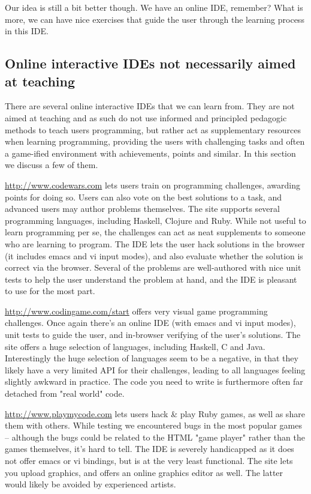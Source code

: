 Our idea is still a bit better though. We have an online IDE, remember? What 
is more, we can have nice exercises that guide the user through the learning 
process in this IDE.

\subsection{Online interactive IDEs not necessarily aimed at teaching}
There are several online interactive IDEs that we can learn from. They are not 
aimed at teaching and as such do not use informed and principled pedagogic 
methods to teach users programming, but rather act as supplementary resources 
when learning programming, providing the users with challenging tasks and 
often a game-ified environment with achievements, points and similar. In this 
section we discuss a few of them.

\url{http://www.codewars.com} lets users train on programming challenges, 
awarding points for doing so. Users can also vote on the best solutions to a 
task, and advanced users may author problems themselves. The site supports 
several programming languages, including Haskell, Clojure and Ruby. While not 
useful to learn programming per se, the challenges can act as neat supplements 
to someone who are learning to program. The IDE lets the user hack solutions 
in the browser (it includes emacs and vi input modes), and also evaluate 
whether the solution is correct via the browser. Several of the problems are 
well-authored with nice unit tests to help the user understand the problem at 
hand, and the IDE is pleasant to use for the most part.

\url{http://www.codingame.com/start} offers very visual game programming 
challenges. Once again there's an online IDE (with emacs and vi input modes), 
unit tests to guide the user, and in-browser verifying of the user's 
solutions. The site offers a huge selection of languages, including Haskell, C 
and Java. Interestingly the huge selection of languages seem to be a negative, 
in that they likely have a very limited API for their challenges, leading to 
all languages feeling slightly awkward in practice. The code you need to write 
is furthermore often far detached from "real world" code.

\url{http://www.playmycode.com} lets users hack \& play Ruby games, as well as 
share them with others. While testing we encountered bugs in the most popular 
games -- although the bugs could be related to the HTML "game player" rather 
than the games themselves, it's hard to tell. The IDE is severely handicapped 
as it does not offer emacs or vi bindings, but is at the very least 
functional. The site lets you upload graphics, and offers an online graphics 
editor as well. The latter would likely be avoided by experienced artists.

